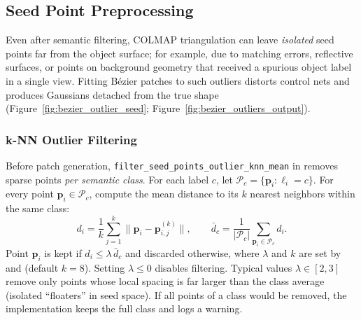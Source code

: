 \subsection{Seed Point Preprocessing}
\label{subsec:seed_preprocessing}

Even after semantic filtering, COLMAP triangulation can leave \emph{isolated} seed points far from the object surface; for example, due to matching errors, reflective surfaces, or points on background geometry that received a spurious object label in a single view. Fitting B\'ezier patches to such outliers distorts control nets and produces Gaussians detached from the true shape (Figure~\ref{fig:bezier_outlier_seed}; Figure~\ref{fig:bezier_outliers_output}).

\subsubsection{k-NN Outlier Filtering}
\label{subsec:knn_outlier}

Before patch generation, \texttt{filter\_seed\_points\_outlier\_knn\_mean} in  removes sparse points \emph{per semantic class}. For each label $c$, let $\mathcal{P}_c=\{\mathbf{p}_i:\ell_i=c\}$. For every point $\mathbf{p}_i\in\mathcal{P}_c$, compute the mean distance to its $k$ nearest neighbors within the same class:
\begin{equation}
d_i = \frac{1}{k}\sum_{j=1}^{k}\|\mathbf{p}_i-\mathbf{p}_{i,j}^{(k)}\|,
\qquad
\bar{d}_c = \frac{1}{|\mathcal{P}_c|}\sum_{\mathbf{p}_i\in\mathcal{P}_c} d_i.
\label{eq:knn_mean_dist}
\end{equation}
Point $\mathbf{p}_i$ is kept if $d_i \le \lambda\,\bar{d}_c$ and discarded otherwise, where $\lambda$ and $k$ are set by  and  (default $k=8$). Setting $\lambda\le 0$ disables filtering. Typical values $\lambda\in[2,3]$ remove only points whose local spacing is far larger than the class average (isolated ``floaters'' in seed space). If all points of a class would be removed, the implementation keeps the full class and logs a warning.

